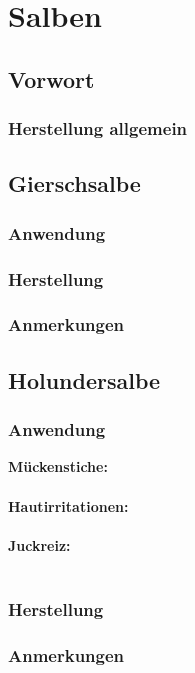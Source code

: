 \chapter{Salben}

\section{Vorwort}

\lipsum[1-5]
\newpage



\subsection{Herstellung allgemein}



\section{Gierschsalbe}

\subsection{Anwendung}

\subsection{Herstellung}

\cite{gierschsalbe}

\subsection{Anmerkungen}





\section{Holundersalbe}

\subsection{Anwendung}

\textbf{Mückenstiche:} \\ \\
\textbf{Hautirritationen:} \\ \\
\textbf{Juckreiz:} \\ \\


\subsection{Herstellung}

\subsection{Anmerkungen}
